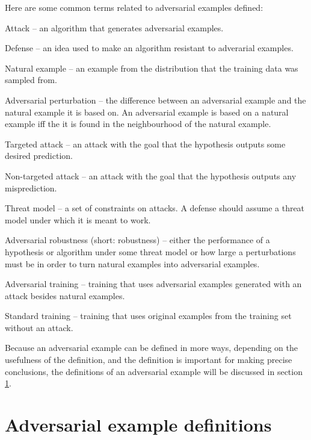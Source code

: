 \documentclass[conference,compsoc]{IEEEtran}
\begin{document}
Here are some common terms related to adversarial examples defined:
\begin{soliditemize}
	\item Attack -- an algorithm that generates adversarial examples.
	\item Defense -- an idea used to make an algorithm resistant to adverarial examples.
	\item Natural example -- an example from the distribution that the training data was sampled from.
	\item Adversarial perturbation -- the difference between an adversarial example and the natural example it is based on. An adversarial example is based on a natural example iff the it is found in the neighbourhood of the natural example.
	\item Targeted attack -- an attack with the goal that the hypothesis outputs some desired prediction.
	\item Non-targeted attack -- an attack with the goal that the hypothesis outputs any misprediction.
	\item Threat model -- a set of constraints on attacks. A defense should assume a threat model under which it is meant to work.
	\item Adversarial robustness (short: robustness) -- either the performance of a hypothesis or algorithm under some threat model or how large a perturbations must be in order to turn natural examples into adversarial examples.
	\item Adversarial training -- training that uses adversarial examples generated with an attack besides natural examples.
	\item Standard training -- training that uses original examples from the training set without an attack.
\end{soliditemize}
Because an adversarial example can be defined in more ways, depending on the usefulness of the definition, and the definition is important for making precise conclusions, the definitions of an adversarial example will be discussed in section \ref{sec:adversarial-example-definitions}.


\section{Adversarial example definitions} \label{sec:adversarial-example-definitions}
\end{document}
